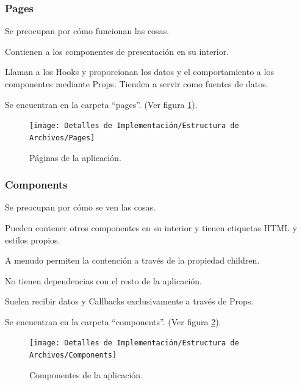 \documentclass[12pt,twoside,titlepage]{report}
\begin{document}
\subsubsection{Pages}

\begin{compactitem}
    \item Se preocupan por cómo funcionan las cosas.
    \item Contienen a los componentes de presentación en su interior.
    \item Llaman a los Hooks y proporcionan los datos y el comportamiento a los componentes mediante Props. Tienden a servir como fuentes de datos.
    \item Se encuentran en la carpeta ``pages''. (Ver figura \ref{fig:Pages}).
\end{compactitem}

\begin{figure}[H]
    \centering
    \texttt{[image: Detalles de Implementación/Estructura de Archivos/Pages]}
    \caption{Páginas de la aplicación.}
    \label{fig:Pages}
\end{figure}

\subsubsection{Components}

\begin{compactitem}
    \item Se preocupan por cómo se ven las cosas.
    \item Pueden contener otros componentes en su interior y tienen etiquetas HTML y estilos propios.
    \item A menudo permiten la contención a través de la propiedad children.
    \item No tienen dependencias con el resto de la aplicación.
    \item Suelen recibir datos y Callbacks exclusivamente a través de Props.
    \item Se encuentran en la carpeta ``components''. (Ver figura \ref{fig:Components}).
\end{compactitem}

\begin{figure}[H]
    \centering
    \texttt{[image: Detalles de Implementación/Estructura de Archivos/Components]}
    \caption{Componentes de la aplicación.}
    \label{fig:Components}
\end{figure}
\end{document}

